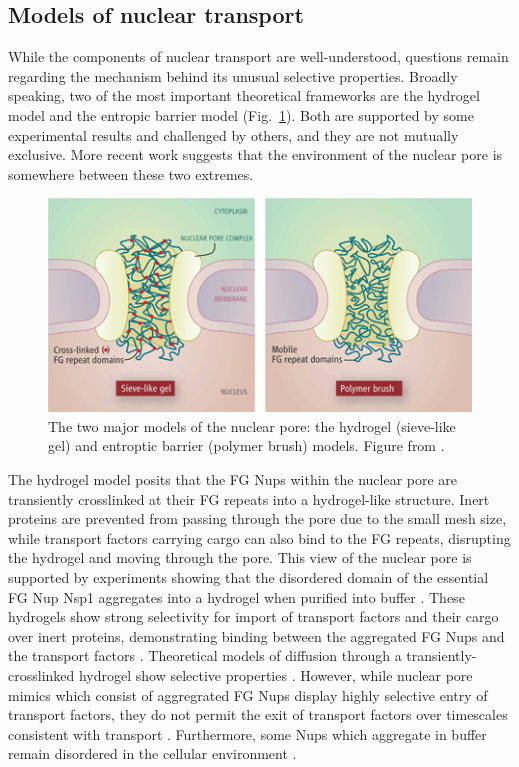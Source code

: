 \subsection{Models of nuclear transport}

While the components of nuclear transport are well-understood, questions remain regarding the mechanism behind its unusual selective properties.  Broadly speaking, two of the most important theoretical frameworks are the hydrogel model and the entropic barrier model (Fig.~\ref{fig:hydrogel-entropic-brush}).  Both are supported by some experimental results and challenged by others, and they are not mutually exclusive.  More recent work suggests that the environment of the nuclear pore is somewhere between these two extremes.

\begin{figure}
\centering
\includegraphics[width=0.6\linewidth]{figs/ch01/elbaum}
\caption[Two important models of nuclear transport.]{The two major models of the nuclear pore: the hydrogel (sieve-like gel) and entroptic barrier (polymer brush) models. Figure from \cite{elbaum06}.}
\label{fig:hydrogel-entropic-brush}
\end{figure}

The hydrogel model posits that the FG Nups within the nuclear pore are transiently crosslinked at their FG repeats into a hydrogel-like structure.  Inert proteins are prevented from passing through the pore due to the small mesh size, while transport factors carrying cargo can also bind to the FG repeats, disrupting the hydrogel and moving through the pore.  This view of the nuclear pore is supported by experiments showing that the disordered domain of the essential FG Nup Nsp1 aggregates into a hydrogel when purified into buffer \cite{frey06}.  These hydrogels show strong selectivity for import of transport factors and their cargo over inert proteins, demonstrating binding between the aggregated FG Nups and the transport factors \cite{frey07,ader10,kim15}.  Theoretical models of diffusion through a transiently-crosslinked hydrogel show selective properties \cite{ribbeck01, bickel02,gu19}.   However, while nuclear pore mimics which consist of aggregrated FG Nups display highly selective entry of transport factors, they do not permit the exit of transport factors over timescales consistent with transport \cite{frey07,ader10}.  Furthermore, some Nups which aggregate in buffer remain disordered in the cellular environment \cite{hough15}.


